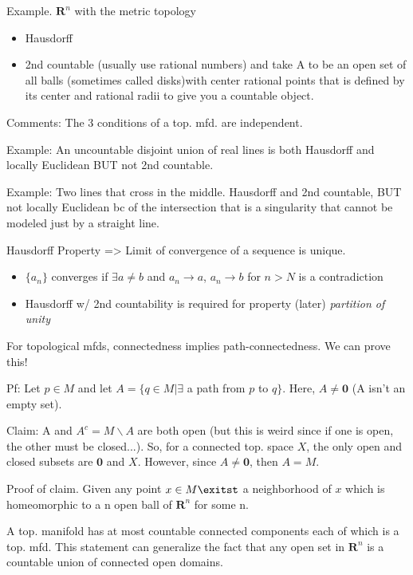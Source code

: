 \documentclass[12pt,letterpaper]{article}
\begin{document}
Example. $\mathbf{R}^n$ with the metric topology 
\begin{itemize}
    \item Hausdorff
    \item 2nd countable (usually use rational numbers) and take A to be an open set of all balls (sometimes called disks)with center rational points that is defined by its center and rational radii to give you a countable object.
\end{itemize}

Comments: The 3 conditions of a top. mfd. are independent. 

Example: An uncountable disjoint union of real lines is both Hausdorff and locally Euclidean BUT not 2nd countable.

Example: Two lines that cross in the middle. Hausdorff and 2nd countable, BUT  not locally Euclidean bc of the intersection that is a singularity that cannot be modeled just by a straight line. 

Hausdorff Property => Limit of convergence of a sequence is unique.
\begin{itemize}
    \item $\{ a_n \}$ converges if $\exists a \neq b$  and $a_n \rightarrow a$, $a_n \rightarrow b$ for $n>N$ is a contradiction
    \item Hausdorff w/ 2nd countability is required for property (later) \textit{partition of unity}
\end{itemize}

For topological mfds, connectedness implies path-connectedness. We can prove this!

Pf: Let $p \in M$ and let $A = \{ q \in M | \exists$ a path from $p$ to $q\}$. Here, $A \neq \mathbf{0}$ (A isn't an empty set).

Claim: A and $A^c = M\backslash A$ are both open (but this is weird since if one is open, the other must be closed...). So, for a connected top. space $X$, the only open and closed subsets are $\mathbf{0}$ and $X$. However, since $A \neq \mathbf{0}$, then $A=M$.

Proof of claim. Given any point $x \in M \exitst$ a neighborhood of $x$ which is homeomorphic to a n open ball of $\mathbf{R}^n$ for some n. 

A top. manifold has at most countable connected components each of which is a top. mfd. This statement can generalize the fact that any open set in $\mathbf{R}^n$ is a countable union of connected open domains. 
\end{document}
